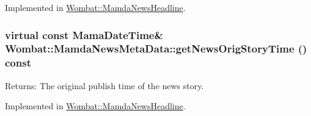 Implemented in \hyperlink{classWombat_1_1MamdaNewsHeadline_75fde990077f814ccc4fb601de8a6d20}{Wombat::Mamda\-News\-Headline}.\hypertarget{classWombat_1_1MamdaNewsMetaData_2102fe268a03b09d9e899e9f7935949c}{
\subsubsection[getNewsOrigStoryTime]{\setlength{\rightskip}{0pt plus 5cm}virtual const Mama\-Date\-Time\& Wombat::Mamda\-News\-Meta\-Data::get\-News\-Orig\-Story\-Time () const}}
\label{classWombat_1_1MamdaNewsMetaData_2102fe268a03b09d9e899e9f7935949c}


\begin{Desc}
\item[Returns:]The original publish time of the news story. \end{Desc}


Implemented in \hyperlink{classWombat_1_1MamdaNewsHeadline_a61ffab170f414fe6ffc986aec9c5ddb}{Wombat::Mamda\-News\-Headline}.